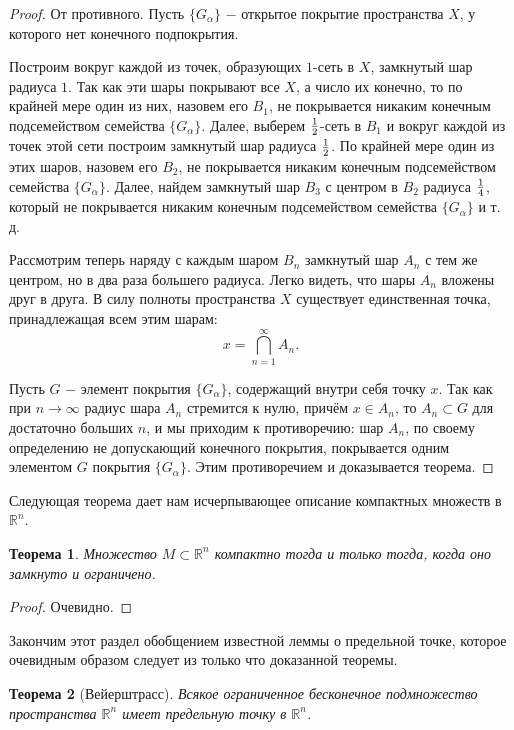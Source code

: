 \documentclass{article}
\newtheorem{theorem}{Теорема}[section]
\begin{document}
\begin{proof}
От противного. Пусть \(\{G_\alpha\}\) \(-\) открытое покрытие пространства \(X\), у которого нет конечного подпокрытия.

Построим вокруг каждой из точек, образующих \(1\)-сеть в \(X\), замкнутый шар радиуса \(1\). Так как эти шары покрывают все \(X\), а число их конечно, то по крайней мере один из них, назовем его \(B_1\), не покрывается никаким конечным подсемейством семейства \(\{G_\alpha\}\). Далее, выберем \(1 \over 2\)-сеть в \(B_1\) и вокруг каждой из точек этой сети построим замкнутый шар радиуса \(1 \over 2\). По крайней мере один из этих шаров, назовем его \(B_2\), не покрывается никаким конечным подсемейством семейства \(\{G_\alpha\}\). Далее, найдем замкнутый шар \(B_3\) с центром в \(B_2\) радиуса \(1 \over 4\), который не покрывается никаким конечным подсемейством семейства \(\{G_\alpha\}\) и т. д.

Рассмотрим теперь наряду с каждым шаром \(B_n\) замкнутый шар \(A_n\) с тем же центром, но в два раза большего радиуса. Легко видеть, что шары \(A_n\) вложены друг в друга. В силу полноты пространства \(X\) существует единственная точка, принадлежащая всем этим шарам:
\[
x = \bigcap\limits_{n=1}^{\infty}A_n.
\]

Пусть \(G\) \(-\) элемент покрытия \(\{G_\alpha\}\), содержащий внутри себя точку \(x\). Так как при \(n \to \infty\) радиус шара \(A_n\) стремится к нулю, причём \(x \in A_n\), то \(A_n \subset G\) для достаточно больших \(n\), и мы приходим к противоречию: шар \(A_n\), по своему определению не допускающий конечного покрытия, покрывается одним элементом \(G\) покрытия \(\{G_\alpha\}\). Этим противоречием и доказывается теорема.
\end{proof}

Следующая теорема дает нам исчерпывающее описание компактных множеств в \(\mathbb{R}^n\).

\begin{theorem}
Множество \(M \subset \mathbb{R}^n\) компактно тогда и только тогда, когда оно замкнуто и ограничено.
\end{theorem}

\begin{proof}
Очевидно.
\end{proof}

Закончим этот раздел обобщением известной леммы о предельной точке, которое очевидным образом следует из только что доказанной теоремы.

\begin{theorem}[Вейерштрасс]
Всякое ограниченное бесконечное подмножество пространства \(\mathbb{R}^n\) имеет предельную точку в \(\mathbb{R}^n\).
\end{theorem}
\end{document}
